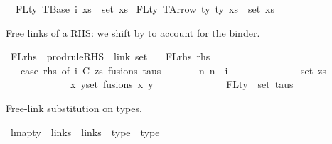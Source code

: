 \begin{isabellebody}
\ \ {\isachardoublequoteopen}FLty\ {\isacharparenleft}{\kern0pt}TBase\ i\ xs{\isacharparenright}{\kern0pt}\ {\isacharequal}{\kern0pt}\ set\ xs{\isachardoublequoteclose}\isanewline
{\isacharbar}{\kern0pt}\ {\isachardoublequoteopen}FLty\ {\isacharparenleft}{\kern0pt}TArrow\ ty{}\ ty{}\ xs{\isacharparenright}{\kern0pt}\ {\isacharequal}{\kern0pt}\ set\ xs{\isachardoublequoteclose}%
\begin{isamarkuptext}%
Free links of a RHS: we shift by  to account for the  binder.%
\end{isamarkuptext}\isamarkuptrue%
\isamarkupfalse%
\ FLrhs\ {\isacharcolon}{\kern0pt}{\isacharcolon}{\kern0pt}\ {\isachardoublequoteopen}prodrule{\isacharunderscore}{\kern0pt}RHS\ {\isacharequal}{\kern0pt}{\isachargreater}{\kern0pt}\ link\ set{\isachardoublequoteclose}\ \isanewline
\ \ {\isachardoublequoteopen}FLrhs\ rhs\ {\isasymequiv}\isanewline
\ \ \ {\isacharparenleft}{\kern0pt}case\ rhs\ of\ {\isacharparenleft}{\kern0pt}i{\isacharcomma}{\kern0pt}\ {\isacharparenleft}{\kern0pt}C{\isacharcomma}{\kern0pt}\ zs{\isacharparenright}{\kern0pt}{\isacharcomma}{\kern0pt}\ fusions{\isacharcomma}{\kern0pt}\ taus{\isacharparenright}{\kern0pt}\ {\isacharequal}{\kern0pt}{\isachargreater}{\kern0pt}\isanewline
\ \ \ \ \ \ {\isacharbraceleft}{\kern0pt}n{\isachardot}{\kern0pt}\ n\ {\isacharplus}{\kern0pt}\ i\ {\isasymin}\isanewline
\ \ \ \ \ \ \ \ \ \ \ \ {\isacharparenleft}{\kern0pt}\ set\ zs\isanewline
\ \ \ \ \ \ \ \ \ \ \ \ {\isasymunion}\ {\isacharparenleft}{\kern0pt}{\isasymUnion}{\isacharparenleft}{\kern0pt}x{\isacharcomma}{\kern0pt}\ y{\isacharparenright}{\kern0pt}{\isasymin}set\ fusions{\isachardot}{\kern0pt}\ {\isacharbraceleft}{\kern0pt}x{\isacharcomma}{\kern0pt}\ y{\isacharbraceright}{\kern0pt}{\isacharparenright}{\kern0pt}\isanewline
\ \ \ \ \ \ \ \ \ \ \ \ {\isasymunion}\ {\isacharparenleft}{\kern0pt}{\isasymUnion}\ {\isacharparenleft}{\kern0pt}FLty\ {\isacharbackquote}{\kern0pt}\ set\ taus{\isacharparenright}{\kern0pt}{\isacharparenright}{\kern0pt}{\isacharparenright}{\kern0pt}{\isacharbraceright}{\kern0pt}{\isacharparenright}{\kern0pt}{\isachardoublequoteclose}%
\begin{isamarkuptext}%
Free-link substitution on types.%
\end{isamarkuptext}\isamarkuptrue%
\isamarkupfalse%
\ lmap{\isacharunderscore}{\kern0pt}ty\ {\isacharcolon}{\kern0pt}{\isacharcolon}{\kern0pt}\ {\isachardoublequoteopen}links\ {\isacharequal}{\kern0pt}{\isachargreater}{\kern0pt}\ links\ {\isacharequal}{\kern0pt}{\isachargreater}{\kern0pt}\ type\ {\isacharequal}{\kern0pt}{\isachargreater}{\kern0pt}\ type{\isachardoublequoteclose}\ \isanewline

\end{isabellebody}
